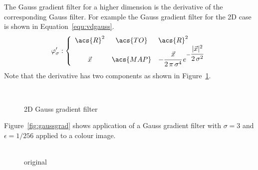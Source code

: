 \documentclass[12pt,a4paper,oneside,openright]{book}
\newcommand{\Eg}{For example }
\newcommand{\equ}[1]{Equation~\ref{equ:#1}}
\newcommand{\fig}[1]{Figure~\ref{fig:#1}}
\begin{document}
\begin{CJK}{UTF8}{}
The Gauss gradient filter for a higher dimension is the derivative of the corresponding Gauss filter. \Eg the Gauss gradient filter for the \ac{2D} case is shown in \equ{vdgauss}.
\begin{equation}\label{equ:vdgauss}
  \varphi^\prime_\sigma:\left\{\begin{array}{ccl}\acs{R}^2&\acs{TO}&\acs{R}^2\\\vec{x}&\acs{MAP}&-\cfrac{\vec{x}}{2\,\pi\,\sigma^4}\,e^{-\cfrac{|\vec{x}|^2}{2\,\sigma^2}}\end{array}\right.
\end{equation}
Note that the derivative has two components as shown in \fig{dgauss}.
\begin{figure}[htbp]
  \begin{center}
    \ 
    \caption{\acs{2D} Gauss gradient filter\label{fig:dgauss}}
  \end{center}
\end{figure}
\fig{gaussgrad} shows application of a Gauss gradient filter with $\sigma=3$ and $\epsilon=1/256$ applied to a colour image.
\begin{figure}[htbp]
   \begin{center}
     \begin{minipage}[t]{.24\textwidth}
       \begin{center}
         \\
         original
       \end{center}
     \end{minipage}
     \begin{minipage}[t]{.24\textwidth}
       \begin{center}
         \\

\end{center}
\end{minipage}
\end{center}
\end{figure}
\end{CJK}
\end{document}
